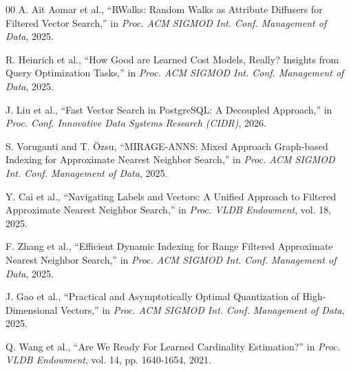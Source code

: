 \documentclass[conference]{IEEEtran}
\begin{document}
\begin{thebibliography}{00}
 A. Ait Aomar et al., ``RWalks: Random Walks as Attribute Diffusers for Filtered Vector Search,'' in \textit{Proc. ACM SIGMOD Int. Conf. Management of Data}, 2025.

 R. Heinrich et al., ``How Good are Learned Cost Models, Really? Insights from Query Optimization Tasks,'' in \textit{Proc. ACM SIGMOD Int. Conf. Management of Data}, 2025.

 J. Liu et al., ``Fast Vector Search in PostgreSQL: A Decoupled Approach,'' in \textit{Proc. Conf. Innovative Data Systems Research (CIDR)}, 2026.

 S. Voruganti and T. Özsu, ``MIRAGE-ANNS: Mixed Approach Graph-based Indexing for Approximate Nearest Neighbor Search,'' in \textit{Proc. ACM SIGMOD Int. Conf. Management of Data}, 2025.

 Y. Cai et al., ``Navigating Labels and Vectors: A Unified Approach to Filtered Approximate Nearest Neighbor Search,'' in \textit{Proc. VLDB Endowment}, vol. 18, 2025.

 F. Zhang et al., ``Efficient Dynamic Indexing for Range Filtered Approximate Nearest Neighbor Search,'' in \textit{Proc. ACM SIGMOD Int. Conf. Management of Data}, 2025.

 J. Gao et al., ``Practical and Asymptotically Optimal Quantization of High-Dimensional Vectors,'' in \textit{Proc. ACM SIGMOD Int. Conf. Management of Data}, 2025.

 Q. Wang et al., ``Are We Ready For Learned Cardinality Estimation?'' in \textit{Proc. VLDB Endowment}, vol. 14, pp. 1640-1654, 2021.
\end{thebibliography}
\end{document}
